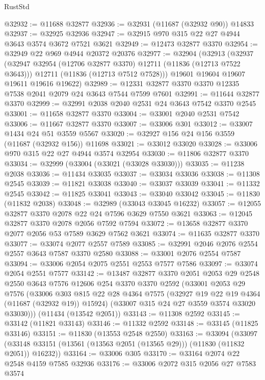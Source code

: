 \begin{lexlean}{RustStd}
\begin{coremodule}
@32932 := @11688 @32877
@32936 := @32931 (@11687 (@32932 @90)) @14833
@32937 := @32925 @32936
@32947 := @32915 @970 @315 @22 @27 @4944 @3643 @3574 @3672 @7521 @3621
@32949 := @12473 @32877 @3370
@32954 := @32949 @22 @969 @4944 @20372 @20376
@32977 := @32904
    (@32913
      (@32937
        (@32947 @32954 (@12706 @32877 @3370) @12711 (@11836 (@12713 @7522 @3643)))
        @12711
        (@11836 (@12713 @7512 @7528)))
      @19601
      @19604
      @19607
      @19611
      @19616
      @19622)
@32989 := @12331 @32877 @3370 @3370 @12335 @7538 @2041 @2079 @24 @3643 @7544 @7599 @7601
@32991 := @11644 @32877 @3370
@32999 := @32991 @2038 @2040 @2531 @24 @3643 @7542 @3370 @2545
@33001 := @11658 @32877 @3370
@33004 := @33001 @2040 @2531 @7542
@33006 := @11667 @32877 @3370
@33007 := @33006 @301
@33012 := @33007 @1434 @24 @51 @3559 @5567
@33020 := @32927 @156 @24 @156 @3559 (@11687 (@32932 @156)) @11698
@33021 := @33012 @33020
@33028 := @33006 @970 @315 @22 @27 @4944 @3574 @32954
@33030 := @11806 @32877 @3370
@33034 := @32999 (@33004 (@33021 (@33028 @33030)))
@33035 := @11238 @2038
@33036 := @11434 @33035
@33037 := @33034 @33036
@33038 := @11308 @2545
@33039 := @11821 @33038
@33040 := @33037 @33039
@33041 := @11332 @2545
@33042 := @11825 @33041
@33043 := @33040 @33042
@33045 := @11830 (@11832 @2038)
@33048 := @32989 (@33043 @33045 @16232)
@33057 := @12055 @32877 @3370 @2078 @22 @24 @7596 @3629 @7550 @3621
@33063 := @12045 @32877 @3370 @2078 @2056 @7592 @7594
@33072 := @13658 @32877 @3370 @2077 @2056 @53 @7589 @3629 @7562 @3621
@33074 := @11635 @32877 @3370
@33077 := @33074 @2077 @2557 @7589
@33085 := @32991 @2046 @2076 @2554 @2557 @3643 @7587 @3370 @2580
@33088 := @33001 @2076 @2554 @7587
@33094 := @33006 @2054 @2075 @2551 @2553 @7577 @7586
@33097 := @33074 @2054 @2551 @7577
@33142 := @13487
    @32877
    @3370
    @2051
    @2053
    @29
    @2548
    @2550
    @3643
    @7576
    @12606
    @254
    @3370
    @3370
    @2592
    (@33001
      @2053
      @29
      @7576
      (@33006
        @303
        @815
        @22
        @28
        @4364
        @7575
        (@32927 @19 @22 @19 @4364 (@11687 (@32932 @19)) @15924)
        (@33007 @315 @24 @27 @3559 @3574 @33020 @33030)))
    (@11434 (@13542 @2051))
@33143 := @11308 @2592
@33145 := @33142 (@11821 @33143)
@33146 := @11332 @2592
@33148 := @33145 (@11825 @33146)
@33151 := @11830 (@13553 @2548 @2550)
@33163 := @33094
    (@33097 (@33148 @33151 (@13561 (@13563 @2051 (@13565 @29))) (@11830 (@11832 @2051)) @16232))
@33164 := @33006 @305
@33170 := @33164 @2074 @22 @2548 @4159 @7585 @32936
@33176 := @33006 @2072 @315 @2056 @27 @7583 @3574

\end{coremodule}
\end{lexlean}
